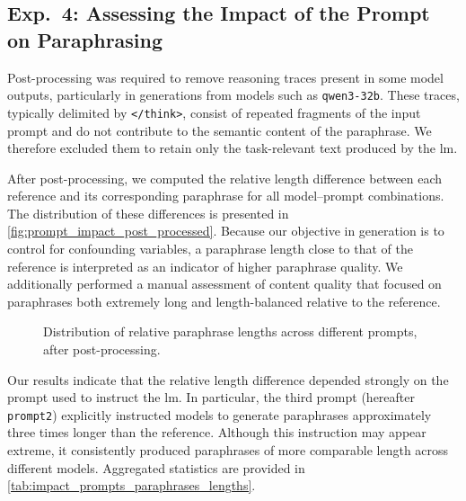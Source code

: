 \subsection{Exp.\ 4: Assessing the Impact of the Prompt on Paraphrasing}
\label{subsec:prompt_impact_res}


Post-processing was required to remove reasoning traces present in some model outputs, particularly in generations from models such as \texttt{qwen3-32b}. 
These traces, typically delimited by \texttt{</think>}, consist of repeated fragments of the input prompt and do not contribute to the semantic content of the paraphrase. 
We therefore excluded them to retain only the task-relevant text produced by the \ac{lm}.

After post-processing, we computed the relative length difference between each reference and its corresponding paraphrase for all model–prompt combinations. 
The distribution of these differences is presented in \autoref{fig:prompt_impact_post_processed}. 
Because our objective in \imp{} generation is to control for confounding variables, a paraphrase length close to that of the reference is interpreted as an indicator of higher paraphrase quality. 
We additionally performed a manual assessment of content quality that focused on paraphrases both extremely long and length-balanced relative to the reference.

\begin{figure}[htbp]
    \centering
    
    \caption[Impact of different prompts on paraphrases.]{
    Distribution of relative paraphrase lengths across different prompts, after post-processing.    
    }
    \label{fig:prompt_impact_post_processed}
\end{figure}

Our results indicate that the relative length difference depended strongly on the prompt used to instruct the \ac{lm}. 
In particular, the third prompt (hereafter \texttt{prompt2}) explicitly instructed models to generate paraphrases approximately three times longer than the reference. 
Although this instruction may appear extreme, it consistently produced paraphrases of more comparable length across different models. 
Aggregated statistics are provided in \autoref{tab:impact_prompts_paraphrases_lengths}.


